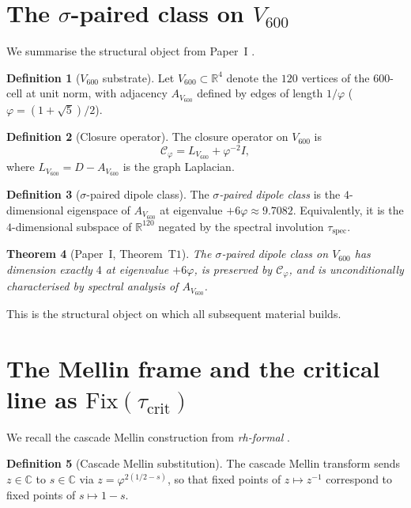 \documentclass[11pt,a4paper]{article}
\newtheorem{theorem}{Theorem}
\theoremstyle{definition}
\newtheorem{definition}[theorem]{Definition}
\theoremstyle{remark}
\begin{document}
\section{The $\sigma$-paired class on $V_{600}$}\label{sec:sigma_paired}

We summarise the structural object from Paper~I
\cite{SmartExistenceClosure}.

\begin{definition}[$V_{600}$ substrate]
Let $V_{600} \subset \mathbb{R}^4$ denote the $120$ vertices of the
$600$-cell at unit norm, with adjacency $A_{V_{600}}$ defined by edges
of length $1/\varphi$ ($\varphi = (1+\sqrt{5})/2$).
\end{definition}

\begin{definition}[Closure operator]
The closure operator on $V_{600}$ is
\[
\mathcal{C}_\varphi = L_{V_{600}} + \varphi^{-2} I,
\]
where $L_{V_{600}} = D - A_{V_{600}}$ is the graph Laplacian.
\end{definition}

\begin{definition}[$\sigma$-paired dipole class]
The \emph{$\sigma$-paired dipole class} is the $4$-dimensional eigenspace
of $A_{V_{600}}$ at eigenvalue $+6\varphi \approx 9.7082$. Equivalently,
it is the $4$-dimensional subspace of $\mathbb{R}^{120}$ negated by the
spectral involution $\tau_{\mathrm{spec}}$.
\end{definition}

\begin{theorem}[Paper~I, Theorem~T$1$]\label{thm:sigma_paired}
The $\sigma$-paired dipole class on $V_{600}$ has dimension exactly $4$
at eigenvalue $+6\varphi$, is preserved by $\mathcal{C}_\varphi$, and is
unconditionally characterised by spectral analysis of $A_{V_{600}}$.
\end{theorem}

This is the structural object on which all subsequent material builds.

\section{The Mellin frame and the critical line as $\mathrm{Fix}(\tau_{\mathrm{crit}})$}\label{sec:mellin}

We recall the cascade Mellin construction from \emph{rh-formal}
\cite{rhFormalSmart}.

\begin{definition}[Cascade Mellin substitution]
The cascade Mellin transform sends $z \in \mathbb{C}$ to $s \in \mathbb{C}$
via $z = \varphi^{2(1/2 - s)}$, so that fixed points of $z \mapsto z^{-1}$
correspond to fixed points of $s \mapsto 1 - s$.
\end{definition}
\end{document}

